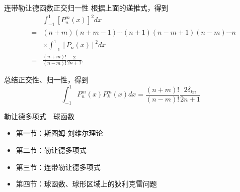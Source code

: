 \documentclass[11pt]{beamer}
\begin{document}
\begin{frame}{连带勒让德函数正交归一性}
根据上面的递推式，得到
\begin{eqnarray}
&& \int^1_{-1} [ P^m_n(x) ]^2 dx \nonumber\\
&=& (n+m)(n+m-1) \cdots (n+1) (n-m+1)(n-m) \cdots n \nonumber\\
&& \times \int^1_{-1} [ P_n(x) ]^2 dx
\nonumber\\
&=& \frac{(n+m)!}{(n-m)!}\frac{2}{2n+1}.
\end{eqnarray}

总结正交性、归一性，得到
\begin{equation}
\int^1_{-1} P^m_n(x) P^m_k(x) dx = \frac{(n+m)!}{(n-m)!}\frac{2 \delta_{kn}}{2n+1}
\end{equation}

\end{frame}

\begin{frame}{勒让德多项式　球函数}
\begin{itemize}
	\item 第一节：斯图姆-刘维尔理论
	\vspace{1cm}
	\item 第二节：勒让德多项式
	\vspace{1cm}
	\item 第三节：连带勒让德多项式
	\vspace{1cm}
	\item {\color{blue}第四节：球函数、球形区域上的狄利克雷问题}
\end{itemize}
\end{frame}
\end{document}
